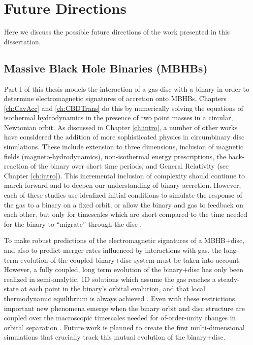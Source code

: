 \chapter[Future Directions]{Future Directions} \label{ch:future}

Here we discuss the possible future directions of the work presented in this dissertation.

\section{Massive Black Hole Binaries (MBHBs)} 

Part I of this thesis models the interaction of a gas disc with a binary in
order to determine electromagnetic signatures of accretion onto MBHBs.
Chapters \ref{ch:CavAcc} and \ref{ch:CBDTrans} do this by numerically solving
the equations of isothermal hydrodynamics in the presence of two point masses
in a circular, Newtonian orbit. As discussed in Chapter
\ref{ch:intro}, a number of other works have considered the addition of more
sophisticated physics in circumbinary disc simulations. These include
extension to three dimensions, inclusion of magnetic fields (magneto-hydrodynamics), 
non-isothermal energy prescriptions, the back-reaction of the binary over short
time periods, and General Relativity (see Chapter \ref{ch:intro}). This
incremental inclusion of complexity should continue to march forward and to
deepen our understanding of binary accretion. However, each of these studies
use idealized initial conditions to simulate the response of the gas to a
binary on a fixed orbit, or allow the binary and gas to feedback on each
other, but only for timescales which are short compared to the time needed for
the binary to ``migrate'' through the disc
\citep[\textit{e.g.},][]{RoedigSGmigrate:2014}.




To make robust predictions of the electromagnetic signatures of a MBHB+disc, and also to
predict merger rates influenced by interactions with gas, the
long-term evolution of the coupled binary+disc system must be taken into
account.  However, a fully coupled, long term evolution of the binary+disc has
only been realized in semi-analytic, 1D solutions which assume the gas reaches
a steady-state at each point in the binary's orbital evolution, and that local
thermodynamic equilibrium is always achieved \citep{KHL:2012:MNRAS_PI}.
Even with these restrictions, important new phenomena emerge when the binary
orbit and disc structure are coupled over the macroscopic timescales needed
for of-order-unity changes in orbital separation \citep{KHL:2012:MNRAS_PII}.
Future work is planned to create the first multi-dimensional simulations 
that crucially track this mutual evolution of the binary+disc. 

